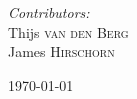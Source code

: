 \begin{titlepage}
\begin{center}
\begin{minipage}[t]{0.4\textwidth}
\begin{flushleft}
\end{flushleft}
\end{minipage}
\begin{minipage}[t]{0.4\textwidth}
\begin{flushright} \large
\emph{Contributors:} \\
Thijs \textsc{van den Berg}\\
James \textsc{Hirschorn}
\end{flushright}
\end{minipage}

\vfill

{\large \today}

\end{center}

\end{titlepage}
